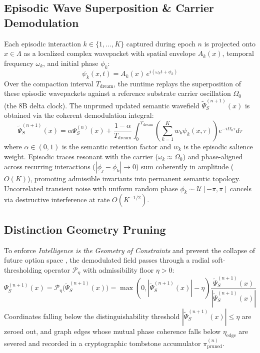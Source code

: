 \documentclass[10pt, twocolumn, a4paper]{article}
\begin{document}
\subsection{Episodic Wave Superposition \& Carrier Demodulation}
Each episodic interaction $k \in \{1, \dots, K\}$ captured during epoch $n$ is projected onto $x \in \Lambda$ as a localized complex wavepacket with spatial envelope $A_k(x)$, temporal frequency $\omega_k$, and initial phase $\phi_k$:
\begin{equation}
\psi_k(x, t) = A_k(x) \, e^{i(\omega_k t + \phi_k)}
\end{equation}
Over the compaction interval $T_{\text{dream}}$, the runtime replays the superposition of these episodic wavepackets against a reference substrate carrier oscillation $\Omega_0$ (the 8B delta clock). The unpruned updated semantic wavefield $\widetilde{\Psi}_S^{(n+1)}(x)$ is obtained via the coherent demodulation integral:
\begin{equation}
\widetilde{\Psi}_S^{(n+1)}(x) = \alpha \Psi_S^{(n)}(x) + \frac{1 - \alpha}{T_{\text{dream}}} \int_{0}^{T_{\text{dream}}} \left( \sum_{k=1}^{K} w_k \psi_k(x, \tau) \right) e^{-i \Omega_0 \tau} d\tau
\end{equation}
where $\alpha \in (0, 1)$ is the semantic retention factor and $w_k$ is the episodic salience weight. Episodic traces resonant with the carrier ($\omega_k \approx \Omega_0$) and phase-aligned across recurring interactions ($|\phi_j - \phi_k| \to 0$) sum coherently in amplitude ($O(K)$), promoting admissible invariants into permanent semantic topology. Uncorrelated transient noise with uniform random phase $\phi_k \sim \mathcal{U}[-\pi, \pi]$ cancels via destructive interference at rate $O(K^{-1/2})$.

\subsection{Distinction Geometry Pruning}
To enforce \textit{Intelligence is the Geometry of Constraints} \cite{guimond2026constraints} and prevent the collapse of future option space \cite{guimond2026collapse}, the demodulated field passes through a radial soft-thresholding operator $\mathcal{P}_{\eta}$ with admissibility floor $\eta > 0$:
\begin{equation}
\Psi_S^{(n+1)}(x) = \mathcal{P}_{\eta}\Big(\widetilde{\Psi}_S^{(n+1)}(x)\Big) = \max\left(0, \left|\widetilde{\Psi}_S^{(n+1)}(x)\right| - \eta\right) \frac{\widetilde{\Psi}_S^{(n+1)}(x)}{\left|\widetilde{\Psi}_S^{(n+1)}(x)\right|}
\end{equation}
Coordinates falling below the distinguishability threshold $|\widetilde{\Psi}_S^{(n+1)}(x)| \le \eta$ are zeroed out, and graph edges whose mutual phase coherence falls below $\eta_{\text{edge}}$ are severed and recorded in a cryptographic tombstone accumulator $\pi_{\text{pruned}}^{(n)}$.
\end{document}
